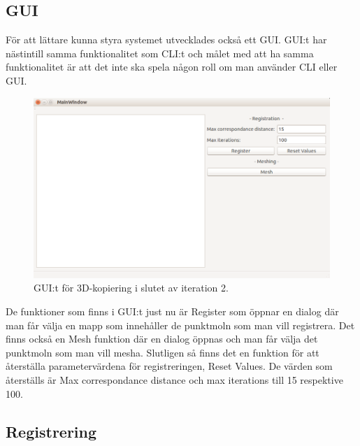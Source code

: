 \subsection{GUI}
För att lättare kunna styra systemet utvecklades också ett GUI. GUI:t har nästintill samma funktionalitet som CLI:t och målet med att ha samma funktionalitet är att det inte ska spela någon roll om man använder CLI eller GUI.

\begin{figure}[H]
	\centering
	\includegraphics[width=130mm]{figures/3DCopyGUI.PNG}
	\caption{GUI:t för 3D-kopiering i slutet av iteration 2.}
	\label{fig:3dcopy_gui_res}
\end{figure}

De funktioner som finns i GUI:t just nu är Register som öppnar en dialog där man får välja en mapp som innehåller de punktmoln som man vill registrera. Det finns också en Mesh funktion där en dialog öppnas och man får välja det punktmoln som man vill mesha. Slutligen så finns det en funktion för att återställa parametervärdena för registreringen, Reset Values. De värden som återställs är Max correspondance distance och max iterations till 15 respektive 100.

\subsection{Registrering}

